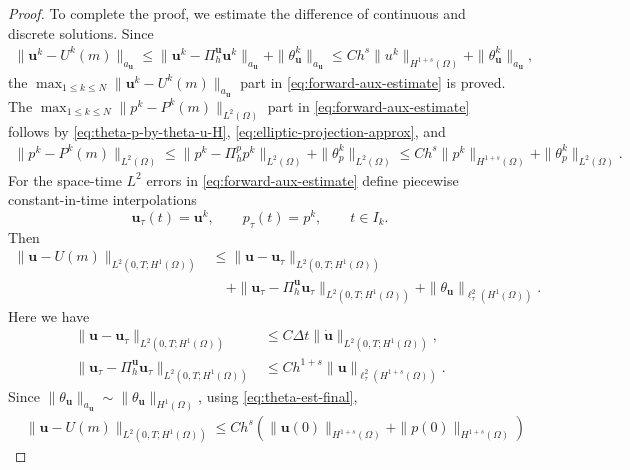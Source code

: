 \documentclass{amsart}
\begin{document}
\begin{proof}
To complete the proof, we estimate the difference of continuous and discrete solutions. Since 
%
\begin{align*}
    \|\boldsymbol{u}^k - U^k(m)\|_{a_{\boldsymbol{u}}} \le \|\boldsymbol{u}^k - \Pi_h^{\boldsymbol{u}} \boldsymbol{u}^k\|_{a_{\boldsymbol{u}}} + \|\theta_{\boldsymbol{u}}^k\|_{a_{\boldsymbol{u}}} 
    \le Ch^s \| u^k \|_{H^{1+s}(\Omega)} + \|\theta_{\boldsymbol{u}}^k\|_{a_{\boldsymbol{u}}},
\end{align*}
%
the $\max_{1\le k\le N}\| \boldsymbol{u}^k - U^k(m)\|_{a_{\boldsymbol{u}}}$ part in \eqref{eq:forward-aux-estimate} is proved. The $\max_{1\le k\le N}\| p^k - P^k(m)\|_{L^2(\Omega)}$ part in \eqref{eq:forward-aux-estimate} follows by \eqref{eq:theta-p-by-theta-u-H},  \eqref{eq:elliptic-projection-approx}, and 
%
\begin{align*}
        \|p^k - P^k(m)\|_{L^2(\Omega)} \le \| p^k - \Pi_h^{p} p^k\|_{L^2(\Omega)} + \|\theta_{p}^k\|_{L^2(\Omega)} 
    \le Ch^s \| p^k \|_{H^{1+s}(\Omega)} + \|\theta_{p}^k\|_{L^2(\Omega)}.
\end{align*}
%
For the space-time $L^2$ errors in \eqref{eq:forward-aux-estimate} define piecewise constant-in-time interpolations
%
\[
        \boldsymbol u_\tau(t)=\boldsymbol u^k,
        \qquad
        p_\tau(t)=p^k,
        \qquad t\in I_k.
\]
%
Then
\[
\begin{aligned}
\|\boldsymbol u-U(m)\|_{L^2(0,T;H^1(\Omega))}
&\le
\|\boldsymbol u-\boldsymbol u_\tau\|_{L^2(0,T;H^1(\Omega))}
\\
&\quad
+
\|\boldsymbol u_\tau-\Pi_h^{\boldsymbol u}\boldsymbol u_\tau\|_{L^2(0,T;H^1(\Omega))}
+
\|\theta_{\boldsymbol u}\|_{\ell_\tau^2(H^1(\Omega))}.
\end{aligned}
\]
Here we have 
\begin{align*}
        \|\boldsymbol u-\boldsymbol u_\tau\|_{L^2(0,T;H^1(\Omega))}
        &\le
        C\Delta t
        \|\dot{\boldsymbol u}\|_{L^2(0,T;H^1(\Omega))},
        \\
        \|\boldsymbol u_\tau-\Pi_h^{\boldsymbol u}\boldsymbol u_\tau\|_{L^2(0,T;H^1(\Omega))}
        &\le
        C h^{1+s}
        \|\boldsymbol u\|_{\ell_\tau^2(H^{1+s}(\Omega))}.
\end{align*}
Since $\|\theta_{\boldsymbol{u}}\|_{a_{\boldsymbol{u}}} \sim \|\theta_{\boldsymbol{u}}\|_{H^1(\Omega)}$, using \eqref{eq:theta-est-final},
\[
\begin{aligned}
&\|\boldsymbol u-U(m)\|_{L^2(0,T;H^1(\Omega))}
\le  Ch^{s} (\|\boldsymbol{u}(0)\|_{H^{1+s}(\Omega)} + \|p(0)\|_{H^{1+{s}}(\Omega)} )

\end{aligned}\]
\end{proof}
\end{document}
